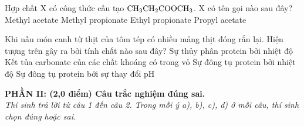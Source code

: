 \documentclass[11pt,a4paper]{article}
\begin{document}
\begin{ex}
Hợp chất X có công thức cấu tạo $\ce{CH3CH2COOCH3}$. X có tên gọi nào sau đây?
\choice
{Methyl acetate}
{\True Methyl propionate}
{Ethyl propionate}
{Propyl acetate}

\end{ex}
\begin{ex}
Khi nấu món canh từ thịt của tôm tép có nhiều mảng thịt đóng rắn lại. Hiện tượng trên gây ra bởi tính chất nào sau đây?
\choice
{Sự thủy phân protein bởi nhiệt độ}
{Kết tủa carbonate của các chất khoáng có trong vỏ}
{\True Sự đông tụ protein bởi nhiệt độ}
{Sự đông tụ protein bởi sự thay đổi pH}

\end{ex}
\vspace{4pt}
\noindent
{\color{mainGreen}\textbf{\large PHẦN II: (2,0 điểm) Câu trắc nghiệm đúng sai.}}\\
\textit{\small Thí sinh trả lời từ câu 1 đến câu 2. Trong mỗi ý a), b), c), d) ở mỗi câu, thí sinh chọn đúng hoặc sai.}
\vspace{2pt}
\end{document}
